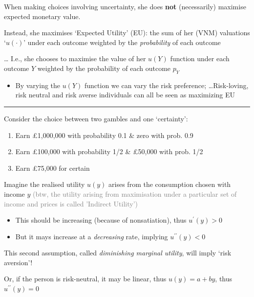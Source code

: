 \documentclass[]{article}
\providecommand{\tightlist}{%
  \setlength{\itemsep}{0pt}\setlength{\parskip}{0pt}}
\begin{document}
When making choices involving uncertainty, she does \textbf{not}
(necessarily) maximise expected monetary value.

Instead, she maximises `Expected Utility' (EU): the sum of her (VNM)
valuations `\(u(\cdot)\)' under each outcome weighted by the
\emph{probability} of each outcome

\ldots{} I.e., she chooses to maximise the value of her \(u(Y)\)
function under each outcome \(Y\) weighted by the probability of each
outcome \(p_Y\)

\begin{itemize}
\tightlist
\item
  By varying the \(u(Y)\) function we can vary the risk preference;
  \ldots Risk-loving, risk neutral and risk averse individuals can all
  be seen as maximizing EU
\end{itemize}

\begin{center}\rule{0.5\linewidth}{\linethickness}\end{center}

Consider the choice between two gambles and one `certainty':

\begin{enumerate}
\def\labelenumi{\arabic{enumi}.}
\tightlist
\item
  Earn £1,000,000 with probability 0.1 \& zero with prob. 0.9
\item
  Earn £100,000 with probability 1/2 \& £50,000 with prob. 1/2
\item
  Earn £75,000 for certain
\end{enumerate}

\bigskip

Imagine the realised utility \(u(y)\) arises from the consumption chosen
with income \(y\)
\textcolor{gray}{(btw, the utility arising from maximisation under a particular set of income and prices is called 'Indirect Utility')}

\begin{itemize}
\tightlist
\item
  This should be increasing (because of nonsatiation), thus
  \(u^\prime (y)>0\)
\item
  But it mays increase at a \emph{decreasing} rate, implying
  \(u^{\prime \prime}(y)< 0\)
\end{itemize}

This second assumption, called \emph{diminishing marginal utility}, will
imply `risk aversion'!

Or, if the person is risk-neutral, it may be linear, thus
\(u(y) = a + by\), thus \(u^{\prime \prime}(y)=0\)
\end{document}

